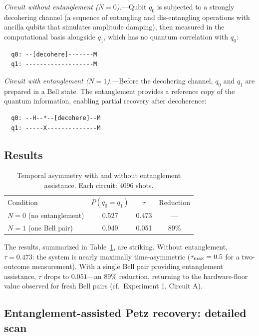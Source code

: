 \documentclass[prl,twocolumn,superscriptaddress,longbibliography,floatfix]{revtex4-2}
\newcommand{\tauasym}{\tau}
\begin{document}
\textit{Circuit without entanglement ($N=0$).}---Qubit $q_0$ is
subjected to a strongly decohering channel (a sequence of
entangling and dis-entangling operations with ancilla qubits that
simulates amplitude damping), then measured in the computational
basis alongside $q_1$, which has no quantum correlation with $q_0$:
\begin{verbatim}
  q0: --[decohere]-------M
  q1: -------------------M
\end{verbatim}

\textit{Circuit with entanglement ($N=1$).}---Before the decohering
channel, $q_0$ and $q_1$ are prepared in a Bell state.  The
entanglement provides a reference copy of the quantum information,
enabling partial recovery after decoherence:
\begin{verbatim}
  q0: --H--*--[decohere]--M
  q1: -----X--------------M
\end{verbatim}

\subsection{Results}

\begin{table}[b]
\caption{\label{tab:floor}Temporal asymmetry with and without
entanglement assistance. Each circuit: 4096 shots.}
\begin{ruledtabular}
\begin{tabular}{lccc}
\textrm{Condition} & $P(q_0{=}q_1)$ & $\tauasym$ &
  Reduction \\
\colrule
$N=0$ (no entanglement)  & 0.527 & 0.473 & --- \\
$N=1$ (one Bell pair)    & 0.949 & 0.051 & 89\% \\
\end{tabular}
\end{ruledtabular}
\end{table}

The results, summarized in Table~\ref{tab:floor}, are striking.
Without entanglement, $\tauasym = 0.473$: the system is nearly
maximally time-asymmetric ($\tauasym_{\rm max} = 0.5$ for a
two-outcome measurement).  With a single Bell pair providing
entanglement assistance, $\tauasym$ drops to $0.051$---an 89\%
reduction, returning to the hardware-floor value observed for fresh
Bell pairs (cf.\ Experiment 1, Circuit A).

\subsection{Entanglement-assisted Petz recovery: detailed scan}
\end{document}
